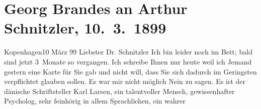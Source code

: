 

         
         \renewcommand{\erwaehntePersonen}{Personen: Theodor Barth, Paul Goldmann, Karl Larsen, Peter Nansen, Annie Vivanti}
         \renewcommand{\erwaehnteInstitutionen}{Institutionen: Die Nation, Frankfurter Zeitung, Neue Freie Presse}
         \renewcommand{\erwaehnteOrte}{Orte: Deutschland, Dänemark, Europa, Italien, Kopenhagen, Südschleswig, Wien}
         \renewcommand{\erwaehnteWerke}{Werke: Annie Vivanti, Das Dänentum in Südjütland, Das Vermächtnis. Schauspiel in drei Akten, Der grüne Kakadu. Groteske in einem Akt, Die Zukunft, Samlede Skrifter [Gesammelte Werke], Tilskueren, Ungdomsvers [Jugendgedichte], [Gedichte]}
               \section[Georg Brandes an Arthur Schnitzler, 10. 3. 1899]{ Georg Brandes an Arthur Schnitzler, 10. 3. 1899}\nopagebreak{}\rehead{ }\begin{ledgroupsized}[t]{13cm}\normalsize\beginnumbering \toendnotes[C]{\smallbreak\pagebreak[2]} 
\toendnotes[C]{\smallbreak}\pstart
           \raggedleft{}{\pb}Kopenhagen10 März 99\pend
           \pstart{}Liebster Dr. Schnitzler\pend\pstart
           Ich bin leider noch im Bett; bald sind jetzt 3 Monate so vergangen. Ich schreibe
               Ihnen nur heute weil ich Jemand gestern eine Karte für Sie gab und nicht will, dass Sie sich dadurch
               im Geringsten verpflichtet glauben sollen. Es war mir nicht möglich Nein zu sagen. Es
               ist der dänische Schriftsteller Karl Larsen, ein talentvoller Mensch,
               gewissenhafter Psycholog, sehr feinhörig in allem Sprachlichen, ein wahrer

\end{ledgroupsized}
